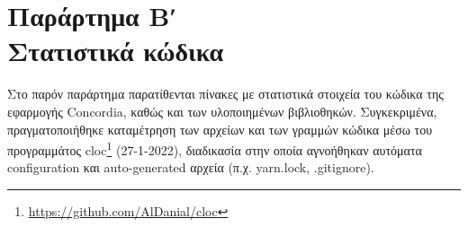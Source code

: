 \chapter*{Παράρτημα Βʹ\\[20pt]Στατιστικά κώδικα}\label{appendix-b}


\captionsetup{labelformat=AppendixBTables}
\setcounter{table}{0}

Στο παρόν παράρτημα παρατίθενται πίνακες με στατιστικά στοιχεία του κώδικα της εφαρμογής Concordia, καθώς και των υλοποιημένων βιβλιοθηκών. Συγκεκριμένα, πραγματοποιήθηκε καταμέτρηση των αρχείων και των γραμμών κώδικα μέσω του προγραμμάτος cloc\footnote{\url{https://github.com/AlDanial/cloc}} (27-1-2022), διαδικασία στην οποία αγνοήθηκαν αυτόματα configuration και auto-generated αρχεία (π.χ. yarn.lock, .gitignore).

